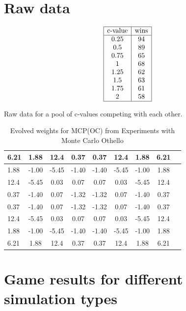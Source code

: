 \documentclass[11pt,a4paper]{article}
\begin{document}
\onecolumn
\centering
\begin{appendices}
\setcounter{table}{0}  
\section{Raw data}
\begin{table}[H]
\[
\begin{array}{|c|c|}
    \hline
    \text{c-value} & \text{wins}\\
    \hline
	0.25 & 94 \\ 
	0.5 & 89 \\ 
	0.75 & 65 \\ 
	1 & 68 \\ 
	1.25 & 62 \\ 
	1.5 & 63 \\ 
	1.75 & 61 \\ 
	2 & 58 \\
	\hline
\end{array} 
\]
\caption{Raw data for a pool of c-values competing with each other.}
\label{table:results-rank-raw}
\end{table}

\begin{table}[H]
	\centering
	\begin{tabular}{|l|c|c|c|c|c|c|c|c|}
		\hline
		6.21 &  1.88 &  12.4 &  0.37 &  0.37 & 12.4  &  1.88 & 6.21 \\
		\hline
		1.88 & -1.00 & -5.45 & -1.40 & -1.40 & -5.45 & -1.00 & 1.88 \\
		\hline
		12.4 & -5.45 &  0.03 &  0.07 &  0.07 &  0.03 & -5.45 & 12.4 \\
		\hline
		0.37 & -1.40 &  0.07 & -1.32 & -1.32 &  0.07 & -1.40 & 0.37 \\
		\hline
		0.37 & -1.40 &  0.07 & -1.32 & -1.32 &  0.07 & -1.40 & 0.37 \\
		\hline
		12.4 & -5.45 &  0.03 &  0.07 &  0.07 &  0.03 & -5.45 & 12.4 \\
		\hline
		1.88 & -1.00 & -5.45 & -1.40 & -1.40 & -5.45 & -1.00 & 1.88 \\
		\hline
		6.21 &  1.88 & 12.4  &  0.37 &  0.37 & 12.4  &  1.88 & 6.21 \\
		\hline
	\end{tabular}
	\caption{Evolved weights for MCP(OC) from Experiments with Monte Carlo Othello\cite{hingston2007experiments}}
	\label{table:othello-weights}
\end{table}

\section{Game results for different simulation types}

\end{appendices}
\end{document}
